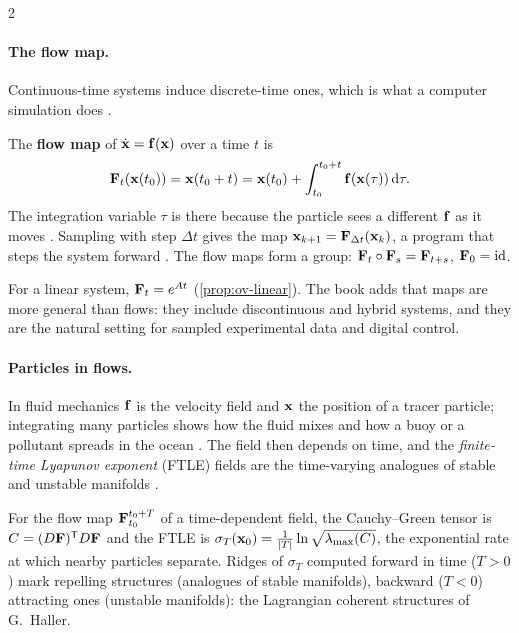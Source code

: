 \begin{paracol}{2}
\paragraph{The flow map.} Continuous-time systems induce discrete-time ones, which is what a computer
simulation does .
\begin{definition}\label{def:fu-flowmap}
The \textbf{flow map} of $\dot{\mathbf{x}}=\mathbf{f}(\mathbf{x})$ over a time $t$ is
\begin{equation}\label{eq:fu-flowmap}
  \mathbf{F}_t(\mathbf{x}(t_0))=\mathbf{x}(t_0+t)=\mathbf{x}(t_0)+\int_{t_0}^{t_0+t}\mathbf{f}(\mathbf{x}(\tau))\,\mathrm d\tau .
\end{equation}
The integration variable $\tau$ is there because the particle sees a different $\mathbf{f}$ as it moves
. Sampling with step $\Delta t$ gives the map $\mathbf{x}_{k+1}=\mathbf{F}_{\Delta t}(\mathbf{x}_k)$,
a program that steps the system forward . The flow maps form a group:
$\mathbf{F}_t\circ\mathbf{F}_s=\mathbf{F}_{t+s}$, $\mathbf{F}_0=\mathrm{id}$.
\end{definition}
For a linear system, $\mathbf{F}_t=e^{At}$ (\cref{prop:ov-linear}). The book adds that maps are more general
than flows: they include discontinuous and hybrid systems, and they are the natural setting for
sampled experimental data and digital control.

\paragraph{Particles in flows.} In fluid mechanics $\mathbf{f}$ is the velocity field and $\mathbf{x}$ the
position of a tracer particle; integrating many particles shows how the fluid mixes and how a buoy or a
pollutant spreads in the ocean . The field then depends on time, and the
\emph{finite-time Lyapunov exponent} (FTLE) fields are the time-varying analogues of stable and
unstable manifolds .

\begin{secondary}
For the flow map $\mathbf{F}_{t_0}^{t_0+T}$ of a time-dependent field, the Cauchy--Green tensor is
$C=(D\mathbf{F})^{\mathsf T}D\mathbf{F}$ and the FTLE is
$\sigma_T(\mathbf{x}_0)=\frac{1}{|T|}\ln\sqrt{\lambda_{\max}(C)}$, the exponential rate at which nearby
particles separate. Ridges of $\sigma_T$ computed forward in time ($T>0$) mark repelling structures
(analogues of stable manifolds), backward ($T<0$) attracting ones (unstable manifolds): the Lagrangian
coherent structures of G.~Haller.
\end{secondary}


\end{paracol}

